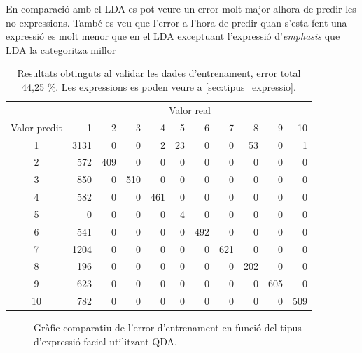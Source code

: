 \documentclass[a4paper]{article}
\begin{document}
En comparació amb el LDA es pot veure un error molt major alhora de predir les no expressions. També es veu que l'error a l’hora de predir quan s’esta fent una expressió es molt menor que en el LDA exceptuant l'expressió d'\emph{emphasis} que LDA la categoritza millor

\begin{table}[H]
	\centering
	\def\arraystretch{1.2}
	\begin{tabular}{|c|rrrrrrrrrr|}
		\hline
		& \multicolumn{10}{c|}{Valor real} \\
		Valor predit & 1 & 2 & 3 & 4 & 5 & 6 & 7 & 8 & 9 & 10 \\
		\hline
		1 & 3131 & 0 & 0 & 2 & 23 & 0 & 0 & 53 & 0 & 1 \\
		2 & 572 & 409 & 0 & 0 & 0 & 0 & 0 & 0 & 0 & 0 \\
		3 & 850 & 0 & 510 & 0 & 0 & 0 & 0 & 0 & 0 & 0 \\
		4 & 582 & 0 & 0 & 461 & 0 & 0 & 0 & 0 & 0 & 0 \\
		5 & 0 & 0 & 0 & 0 & 4 & 0 & 0 & 0 & 0 & 0 \\
		6 & 541 & 0 & 0 & 0 & 0 & 492 & 0 & 0 & 0 & 0 \\
		7 & 1204 & 0 & 0 & 0 & 0 & 0 & 621 & 0 & 0 & 0 \\
		8 & 196 & 0 & 0 & 0 & 0 & 0 & 0 & 202 & 0 & 0 \\
		9 & 623 & 0 & 0 & 0 & 0 & 0 & 0 & 0 & 605 & 0 \\
		10 & 782 & 0 & 0 & 0 & 0 & 0 & 0 & 0 & 0 & 509 \\
		\hline
	\end{tabular}
	\captionsetup{width=0.8\textwidth}
	\caption{Resultats obtinguts al validar les dades d'entrenament, error total 44,25 \%. Les expressions es poden veure a \autoref{sec:tipus_expressio}.}
\end{table}

\begin{figure}[H]
	\centering
	\captionsetup{width=0.8\textwidth}
	\caption{Gràfic comparatiu de l'error d'entrenament en funció del tipus d'expressió facial utilitzant QDA.}
\end{figure}
\end{document}

